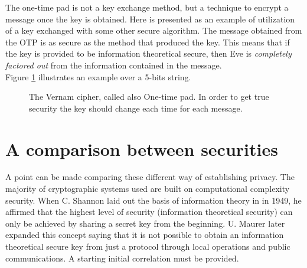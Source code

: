 		The one-time pad is not a key exchange method, but a technique to encrypt a message once the key is obtained.
		Here is presented as an example of utilization of a key exchanged with some other secure algorithm. 
		The message obtained from the OTP is as secure as the method that produced the key.
		This means that if the key is provided to be information theoretical secure, then Eve is \emph{completely factored out} from the information contained in the message.\\
		Figure \ref{Fig:OTP} illustrates an example over a 5-bits string.
		
		\begin{figure}[h!]
			\centering
			
			\caption{The Vernam cipher, called also One-time pad. In order to get true security the key should change each time for each message.}
			\label{Fig:OTP}
		\end{figure}
\section{A comparison between securities}
    A point can be made comparing these different way of establishing privacy.
    The majority of cryptographic systems used are built on computational complexity security. 
	When C. Shannon laid out the basis of information theory in \cite{Shannon49} in 1949, he affirmed that the highest level of security (information theoretical security) can only be achieved by sharing a secret key from the beginning.
	 U. Maurer later expanded this concept saying that it is not possible to obtain an information theoretical secure key from just a protocol through local operations and public communications\cite{Maur93}. A starting initial correlation must be provided.\\
	 
